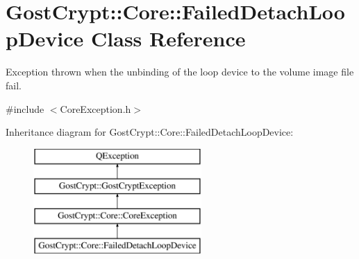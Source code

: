 \hypertarget{class_gost_crypt_1_1_core_1_1_failed_detach_loop_device}{}\section{Gost\+Crypt\+:\+:Core\+:\+:Failed\+Detach\+Loop\+Device Class Reference}
\label{class_gost_crypt_1_1_core_1_1_failed_detach_loop_device}


Exception thrown when the unbinding of the loop device to the volume image file fail.  




{\ttfamily \#include $<$Core\+Exception.\+h$>$}

Inheritance diagram for Gost\+Crypt\+:\+:Core\+:\+:Failed\+Detach\+Loop\+Device\+:\begin{figure}[H]
\begin{center}
\leavevmode
\includegraphics[height=4.000000cm]{class_gost_crypt_1_1_core_1_1_failed_detach_loop_device}
\end{center}
\end{figure}

